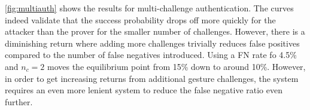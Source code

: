 \autoref{fig:multiauth} shows the results for multi-challenge authentication. The curves indeed validate that the success probability drops off more quickly for the attacker than the prover for the smaller number of challenges. However, there is a diminishing return where adding more challenges trivially reduces false positives compared to the number of false negatives introduced. Using a FN rate fo 4.5\% and $n_{c}=2$ moves the equilibrium point from 15\% down to around 10\%. However, in order to get increasing returns from additional gesture challenges, the system requires an even more lenient system to reduce the false negative ratio even further.

 

